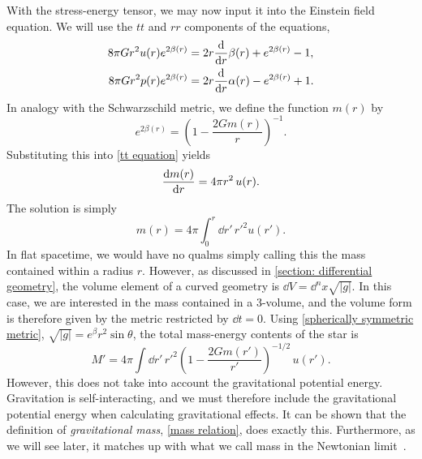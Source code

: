 With the stress-energy tensor, we may now input it into the Einstein field equation.
We will use the $tt$ and $rr$ components of the equations, 
%
\begin{align}
    \label{tt equation}
    8 \pi G r^{2} u{\left(r \right)} e^{2 \beta{\left(r \right)}} 
    & =   2 r \odv{}{r} \beta{\left(r \right)} + e^{2 \beta{\left(r \right)}} - 1, \\
    \label{rr equation}
    8 \pi G r^{2} p{\left(r \right)} e^{2 \beta{\left(r \right)}} 
    & = 2 r \odv{}{r}\alpha{\left(r \right)} - e^{2 \beta{\left(r \right)}} + 1.
\end{align}
%
In analogy with the Schwarzschild metric, we define the function $m(r)$ by
%
\begin{equation}
    \label{definition of m(r)}
    e^{2 \beta(r)} = \left(1 - \frac{2 G m(r)}{r} \right)^{-1}. 
\end{equation}
%
Substituting this into \autoref{tt equation} yields 
%
\begin{equation}
    \label{diff eq mass}
    \odv{m(r)}{r} = 4 \pi r^2 \, u(r).
\end{equation}
%
The solution is simply
%
\begin{equation}
    \label{mass relation}
    m(r) = 4 \pi \int_0^r \dd r' \, {r'}^2 u(r').
\end{equation}
%
In flat spacetime, we would have no qualms simply calling this the mass contained within a radius $r$.
However, as discussed in \autoref{section: differential geometry}, the volume element of a curved geometry is $\dd V = \dd^n x \sqrt{|g|}$.
In this case, we are interested in the mass contained in a 3-volume, and the volume form is therefore given by the metric restricted by $\dd t = 0$.
Using \autoref{spherically symmetric metric}, $\sqrt{|g|} = e^{\beta} r^2 \sin \theta$, the total mass-energy contents of the star is 
%
\begin{equation}
    M' = 4 \pi \int \dd r' \, {r'}^2 \left(1 - \frac{2 G m(r')}{r'}\right)^{-1/2}\, u(r').
\end{equation}
%
However, this does not take into account the gravitational potential energy.
Gravitation is self-interacting, and we must therefore include the gravitational potential energy when calculating gravitational effects.
It can be shown that the definition of \emph{gravitational mass}, \autoref{mass relation}, does exactly this.
Furthermore, as we will see later, it matches up with what we call mass in the Newtonian limit~\autocite{misnerGravitation2009}.


